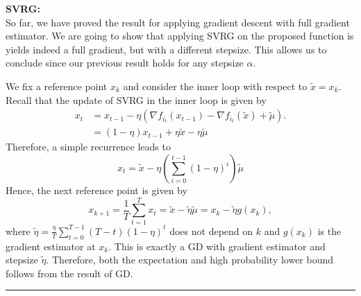 \documentclass{article}
\theoremstyle{definition}  \newtheorem{exercise}{Exercise}
\theoremstyle{plain}
\renewenvironment{proof}{\par\noindent{\bf Proof\ }}{\hfill\BlackBox\\[2mm]}
\newcommand{\BlackBox}{\rule{1.5ex}{1.5ex}}
\theoremstyle{definition}
\theoremstyle{remark}
\newcommand{\msvrg}{T}
\begin{document}
\begin{proof}
{\bf{SVRG:}}\\
So far, we have proved the result for applying gradient descent with full gradient estimator. We are going to show that applying SVRG on the proposed function is yields indeed a full gradient, but with a different stepsize. This allows us to conclude since our previous result holds for any stepsize $\alpha$.

We fix a reference point $x_k$ and consider the inner loop with respect to $\tilde{x} = x_k$. Recall that the update of SVRG in the inner loop is given by
\begin{align*} 
x_t & = x_{t-1} - \eta ( \nabla f_{i_t}(x_{t-1}) - \nabla f_{i_t}(\tilde{x} ) + \tilde{\mu}). \\
    & = (1-\eta) x_{t-1} + \eta \tilde{x}  - \eta \tilde{\mu}
\end{align*}
Therefore, a simple recurrence leads to
\[ x_t = \tilde{x} - \eta (\sum_{i=0}^{t-1} (1-\eta)^i ) \tilde{\mu}\]
Hence, the next reference point is given by
\[ x_{k+1} = \frac{1}{\msvrg} \sum_{t=1}^{\msvrg} x_t = \tilde{x} - \tilde{\eta} \tilde{\mu}  = x_k - \tilde{\eta} g(x_k),\]
where $\tilde{\eta} =  \frac{\eta}{\msvrg} \sum_{t=0}^{\msvrg-1} (\msvrg -t)(1-\eta)^t $ does 
not depend on $k$ and $g(x_k)$ is the gradient estimator at $x_k$. This is exactly a GD with 
gradient estimator and stepsize $\tilde{\eta}$. Therefore, both the expectation and high 
probability lower bound follows from the result of GD. 
\end{proof}











%
 
\end{document}

